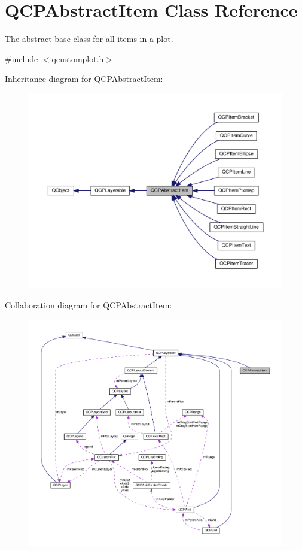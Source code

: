 \hypertarget{classQCPAbstractItem}{}\section{Q\+C\+P\+Abstract\+Item Class Reference}
\label{classQCPAbstractItem}


The abstract base class for all items in a plot.  




{\ttfamily \#include $<$qcustomplot.\+h$>$}



Inheritance diagram for Q\+C\+P\+Abstract\+Item\+:\nopagebreak
\begin{figure}[H]
\begin{center}
\leavevmode
\includegraphics[width=350pt]{classQCPAbstractItem__inherit__graph}
\end{center}
\end{figure}


Collaboration diagram for Q\+C\+P\+Abstract\+Item\+:\nopagebreak
\begin{figure}[H]
\begin{center}
\leavevmode
\includegraphics[width=350pt]{classQCPAbstractItem__coll__graph}
\end{center}
\end{figure}
